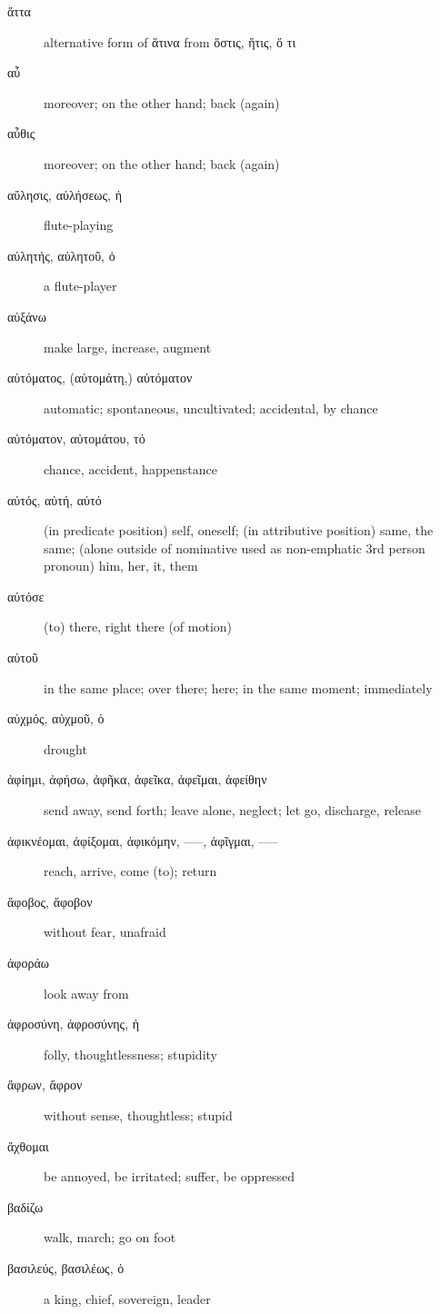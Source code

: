 \documentclass[12pt,letterpaper]{article}
\begin{document}
\begin{description}
    \item[\textgreek{ἅττα}] alternative form of \textgreek{ἅτινα} from \textgreek{ὅστις, ἥτις, ὅ τι}
    \item[\textgreek{αὖ}] \marginnote{*}moreover; on the other hand; back (again)
    \item[\textgreek{αὖθις}] \marginnote{*}moreover; on the other hand; back (again)
    \item[\textgreek{αὔλησις, αὐλήσεως, ἡ}] flute-playing
    \item[\textgreek{αὐλητής, αὐλητοῦ, ὁ}] a flute-player
    \item[\textgreek{αὐξάνω}] make large, increase, augment
    \item[\textgreek{αὐτόματος, (αὐτομάτη,) αὐτόματον}] automatic; spontaneous, uncultivated; accidental, by chance
    \item[\textgreek{αὐτόματον, αὐτομάτου, τό}] chance, accident, happenstance
    \item[\textgreek{αὐτός, αὐτή, αὐτό}] \marginnote{*}(in predicate position) self, oneself; (in attributive position) same, the same; (alone outside of nominative used as non-emphatic 3rd person pronoun) him, her, it, them
    \item[\textgreek{αὐτόσε}] (to) there, right there (of motion)
    \item[\textgreek{αὐτοῦ}] in the same place; over there; here; in the same moment; immediately
    \item[\textgreek{αὐχμός, αὐχμοῦ, ὁ}] drought
    \item[\textgreek{ἀφίημι, ἀφήσω, ἀφῆκα, ἀφεῖκα, ἀφεῖμαι, ἀφείθην}] \marginnote{*}send away, send forth; leave alone, neglect; let go, discharge, release
    \item[\textgreek{ἀφικνέομαι, ἀφίξομαι, ἀφικόμην, –––, ἀφῖγμαι, –––}] \marginnote{*}reach, arrive, come (to); return
    \item[\textgreek{ἄφοβος, ἄφοβον}] without fear, unafraid
    \item[\textgreek{ἀφοράω}] look away from
    \item[\textgreek{ἀφροσύνη, ἀφροσύνης, ἡ}] folly, thoughtlessness; stupidity
    \item[\textgreek{ἄφρων, ἄφρον}] without sense, thoughtless; stupid
    \item[\textgreek{ἄχθομαι}] be annoyed, be irritated; suffer, be oppressed
    \item[\textgreek{βαδίζω}] walk, march; go on foot
    \item[\textgreek{βασιλεύς, βασιλέως, ὁ}] \marginnote{*}a king, chief, sovereign, leader

\end{description}
\end{document}
